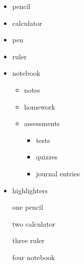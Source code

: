 \documentclass[11pt]{article}
\begin{document}
\begin{itemize}
    \item pencil
    \item calculator
    \item pen
    \item ruler
    \item notebook
          \begin{itemize}
              \item notes
              \item homework
              \item assessments
                    \begin{itemize}
                        \item tests
                        \item quizzes
                        \item journal entries
                    \end{itemize}
          \end{itemize}
    \item highlighters
\end{itemize}

\vspace{1cm}

\begin{enumerate}
    \item[one] pencil
    \item[two] calculator
    \item[three] ruler
    \item[four] notebook
\end{enumerate}
\end{document}
